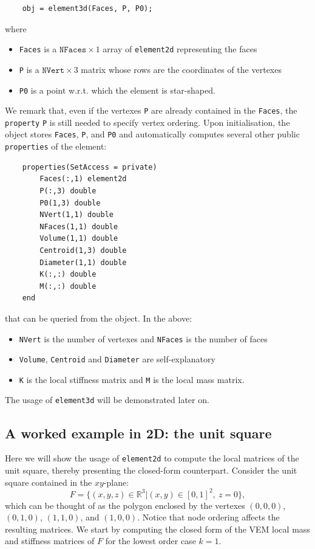 \documentclass[a4paper]{article}
\begin{document}
\begin{lstlisting}
	obj = element3d(Faces, P, P0);
\end{lstlisting}
%
where 
\begin{itemize}
\item \texttt{Faces} is a $\texttt{NFaces} \times 1$ array of \texttt{element2d} representing the faces
\item \texttt{P} is a $\texttt{NVert} \times 3$ matrix whose rows are the coordinates of the vertexes
\item \texttt{P0} is a point w.r.t. which the element is star-shaped.
\end{itemize}
We remark that, even if the vertexes \texttt{P} are already contained in the \texttt{Faces}, the \texttt{property} \texttt{P} is still needed to specify vertex ordering. Upon initialisation, the object stores \texttt{Faces}, \texttt{P}, and \texttt{P0} and automatically computes several other public \texttt{properties} of the element:

\begin{lstlisting}
	properties(SetAccess = private)
		Faces(:,1) element2d
		P(:,3) double
		P0(1,3) double
		NVert(1,1) double
		NFaces(1,1) double
		Volume(1,1) double
		Centroid(1,3) double
		Diameter(1,1) double
		K(:,:) double
		M(:,:) double
	end
\end{lstlisting}

\noindent
that can be queried from the object. In the above:
\begin{itemize}
\item \texttt{NVert} is the number of vertexes and \texttt{NFaces} is the number of faces
\item \texttt{Volume}, \texttt{Centroid} and \texttt{Diameter} are self-explanatory
\item \texttt{K} is the local stiffness matrix and \texttt{M} is the local mass matrix.
\end{itemize}

\noindent
The usage of \texttt{element3d} will be demonstrated later on.

\subsection{A worked example in 2D: the unit square}
\label{sec:unit_square}
Here we will show the usage of \texttt{element2d} to compute the local matrices of the unit square, thereby presenting the closed-form counterpart. Consider the unit square contained in the $xy$-plane:
\begin{equation}
F = \{(x,y,z) \in \mathbb{R}^3 | (x,y) \in [0,1]^2, \ z = 0\},
\end{equation}
which can be thought of as the polygon enclosed by the vertexes $(0, 0, 0)$, $(0, 1, 0)$, $(1,1, 0)$, and $(1, 0, 0)$.  Notice that node ordering affects the resulting matrices.  We start by computing the closed form of the VEM local mass and stiffness matrices of $F$ for the lowest order case $k=1$.
\end{document}
